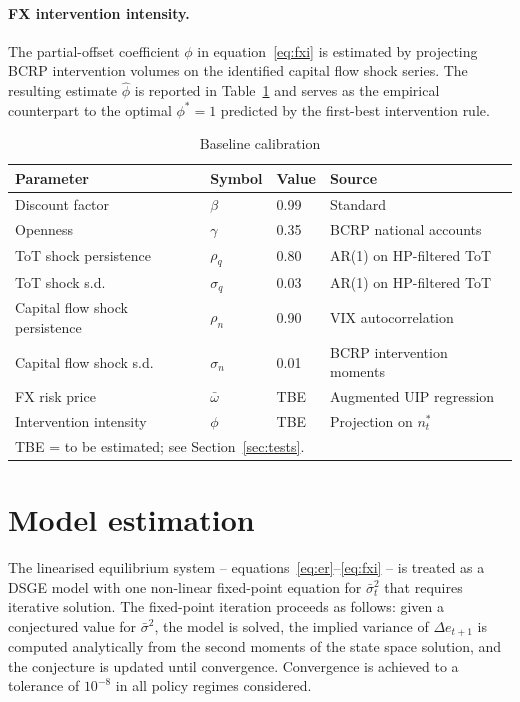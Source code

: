 \documentclass[12pt,a4paper]{article}
\begin{document}
\paragraph{FX intervention intensity.} The partial-offset coefficient $\phi$ in equation~\eqref{eq:fxi} is estimated by projecting BCRP intervention volumes on the identified capital flow shock series. The resulting estimate $\hat{\phi}$ is reported in Table~\ref{tab:calibration} and serves as the empirical counterpart to the optimal $\phi^* = 1$ predicted by the first-best intervention rule.

\begin{table}[H]
    \centering
    \caption{Baseline calibration}
    \label{tab:calibration}
    \begin{tabular}{llll}
        \toprule
        Parameter & Symbol & Value & Source \\
        \midrule
        Discount factor & $\beta$ & 0.99 & Standard \\
        Openness & $\gamma$ & 0.35 & BCRP national accounts \\
        ToT shock persistence & $\rho_q$ & 0.80 & AR(1) on HP-filtered ToT \\
        ToT shock s.d. & $\sigma_q$ & 0.03 & AR(1) on HP-filtered ToT \\
        Capital flow shock persistence & $\rho_n$ & 0.90 & VIX autocorrelation \\
        Capital flow shock s.d. & $\sigma_n$ & 0.01 & BCRP intervention moments \\
        FX risk price & $\bar{\omega}$ & TBE & Augmented UIP regression \\
        Intervention intensity & $\phi$ & TBE & Projection on $n^*_t$ \\
        \bottomrule
        \multicolumn{4}{l}{\footnotesize TBE = to be estimated; see Section~\ref{sec:tests}.}
    \end{tabular}
\end{table}

\section{Model estimation}
\label{sec:estimation}

The linearised equilibrium system -- equations~\eqref{eq:er}--\eqref{eq:fxi} -- is treated as a DSGE model with one non-linear fixed-point equation for $\bar{\sigma}^2_t$ that requires iterative solution. The fixed-point iteration proceeds as follows: given a conjectured value for $\bar{\sigma}^2$, the model is solved, the implied variance of $\Delta e_{t+1}$ is computed analytically from the second moments of the state space solution, and the conjecture is updated until convergence. Convergence is achieved to a tolerance of $10^{-8}$ in all policy regimes considered.
\end{document}
